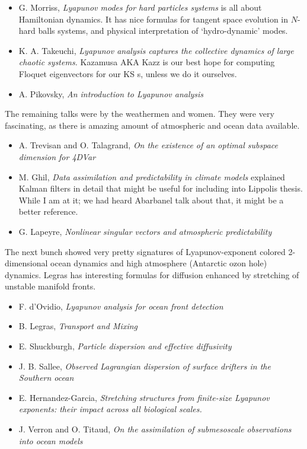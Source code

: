 \begin{itemize}
\begin{description}
\end{description}
  \item G. Morriss, {\em Lyapunov modes for hard
      particles systems} is all about Hamiltonian
      dynamics. It has nice formulas for tangent space
      evolution in $N$-hard balls systems, and physical
      interpretation of `hydro-dynamic' modes.
  \item K. A. Takeuchi, {\em Lyapunov analysis captures
      the collective dynamics of large chaotic
      systems.} Kazamusa AKA Kazz is our best hope for
      computing Floquet eigenvectors for our KS \rpo s,
      unless we do it ourselves.

  \item A. Pikovsky, {\em An introduction to Lyapunov
      analysis
        }
  \end{itemize}
The remaining talks were by the weathermen and women. They were
very fascinating, as there is amazing amount of atmospheric and
ocean data available.
  \begin{itemize}
  \item A. Trevisan and O. Talagrand, {\em On the
      existence of an optimal subspace dimension for
        4DVar }
  \item M. Ghil, {\em Data assimilation and predictability
      in climate models} explained Kalman filters in detail
      that might be useful for including into Lippolis
      thesis. While I am at it; we had heard
      Abarbanel talk about that, it might be a
      better reference.
  \item G. Lapeyre, {\em Nonlinear singular vectors and
      atmospheric predictability }
  \end{itemize}
The next bunch showed very pretty signatures of
Lyapunov-exponent colored 2-dimensional ocean dynamics and
high atmosphere (Antarctic ozon hole) dynamics. Legras has
interesting formulas for diffusion enhanced by stretching
of unstable manifold fronts.
  \begin{itemize}
  \item F. d'Ovidio, {\em Lyapunov analysis for ocean
      front detection }
  \item B. Legras, {\em Transport and Mixing}
  \item E. Shuckburgh, {\em Particle dispersion and
      effective diffusivity }
  \item J. B. Sallee, {\em Observed Lagrangian
      dispersion of surface drifters in the Southern
      ocean }
  \item E. Hernandez-Garcia, {\em Stretching structures
      from finite-size Lyapunov exponents: their impact
      across all biological scales.}
 \item J. Verron and O. Titaud, {\em On the
     assimilation of submesoscale observations into
     ocean models }
  \end{itemize}

